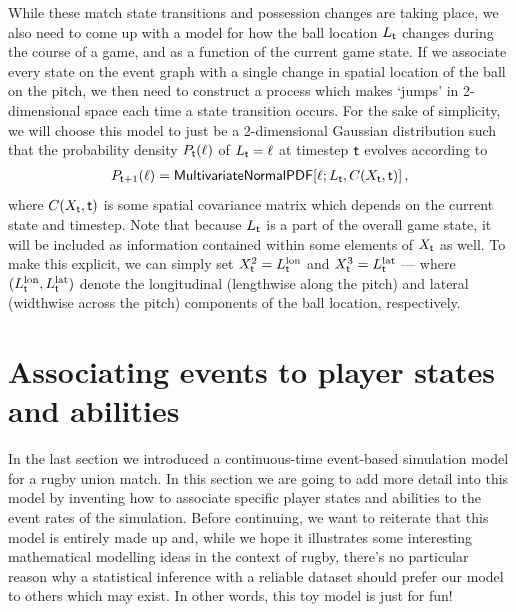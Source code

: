 While these match state transitions and possession changes are taking place, we also need to come up with a model for how the ball location $L_{{\sf t}}$ changes during the course of a game, and as a function of the current game state. If we associate every state on the event graph with a single change in spatial location of the ball on the pitch, we then need to construct a process which makes `jumps' in 2-dimensional space each time a state transition occurs. For the sake of simplicity, we will choose this model to just be a 2-dimensional Gaussian distribution such that the probability density $P_{{\sf t}}(\ell )$ of $L_{{\sf t}}=\ell$ at timestep ${\sf t}$ evolves according to
\begin{align}
P_{{\sf t}+1}(\ell ) = {\sf MultivariateNormalPDF}[\ell ; L_{{\sf t}}, C(X_{{\sf t}}, {\sf t})] \,,
\end{align}
where $C(X_{{\sf t}}, {\sf t})$ is some spatial covariance matrix which depends on the current state and timestep. Note that because $L_{{\sf t}}$ is a part of the overall game state, it will be included as information contained within some elements of $X_{{\sf t}}$ as well. To make this explicit, we can simply set $X^2_{{\sf t}}=L^{\rm lon}_{{\sf t}}$ and $X^3_{{\sf t}}=L^{\rm lat}_{{\sf t}}$ --- where $(L^{\rm lon}_{{\sf t}}, L^{\rm lat}_{{\sf t}})$ denote the longitudinal (lengthwise along the pitch) and lateral (widthwise across the pitch) components of the ball location, respectively.

\section{\sffamily Associating events to player states and abilities}

In the last section we introduced a continuous-time event-based simulation model for a rugby union match. In this section we are going to add more detail into this model by inventing how to associate specific player states and abilities to the event rates of the simulation. Before continuing, we want to reiterate that this model is entirely made up and, while we hope it illustrates some interesting mathematical modelling ideas in the context of rugby, there's no particular reason why a statistical inference with a reliable dataset should prefer our model to others which may exist. In other words, this toy model is just for fun!

